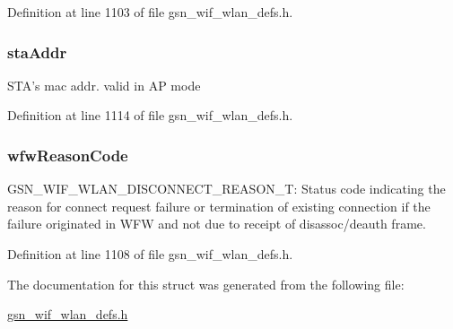 Definition at line 1103 of file gsn\_\-wif\_\-wlan\_\-defs.h.

\hypertarget{a00379_a3ca54ba7eb6c301c5b6584284a9ccb8b}{
\subsubsection[{staAddr}]{ {\bf staAddr}}}
\label{a00379_a3ca54ba7eb6c301c5b6584284a9ccb8b}
STA's mac addr. valid in AP mode 

Definition at line 1114 of file gsn\_\-wif\_\-wlan\_\-defs.h.

\hypertarget{a00379_ad2ec4d4ec0152e0fd6348e39dcd07afd}{
\subsubsection[{wfwReasonCode}]{ {\bf wfwReasonCode}}}
\label{a00379_ad2ec4d4ec0152e0fd6348e39dcd07afd}
GSN\_\-WIF\_\-WLAN\_\-DISCONNECT\_\-REASON\_\-T: Status code indicating the reason for connect request failure or termination of existing connection if the failure originated in WFW and not due to receipt of disassoc/deauth frame. 

Definition at line 1108 of file gsn\_\-wif\_\-wlan\_\-defs.h.



The documentation for this struct was generated from the following file:\begin{DoxyCompactItemize}
\item 
\hyperlink{a00613}{gsn\_\-wif\_\-wlan\_\-defs.h}\end{DoxyCompactItemize}
